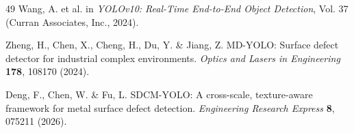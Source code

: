\documentclass[pdflatex,sn-nature]{sn-jnl}
\begin{document}
\begin{thebibliography}{49}
Wang, A. et al. in \textit{YOLOv10: Real-Time End-to-End Object Detection}, Vol. 37 (Curran Associates, Inc., 2024).

Zheng, H., Chen, X., Cheng, H., Du, Y. \& Jiang, Z. MD-YOLO: Surface defect detector for industrial complex environments. \textit{Optics and Lasers in Engineering} \textbf{178}, 108170 (2024).

Deng, F., Chen, W. \& Fu, L. SDCM-YOLO: A cross-scale, texture-aware framework for metal surface defect detection. \textit{Engineering Research Express} \textbf{8}, 075211 (2026).

\end{thebibliography}
\end{document}
